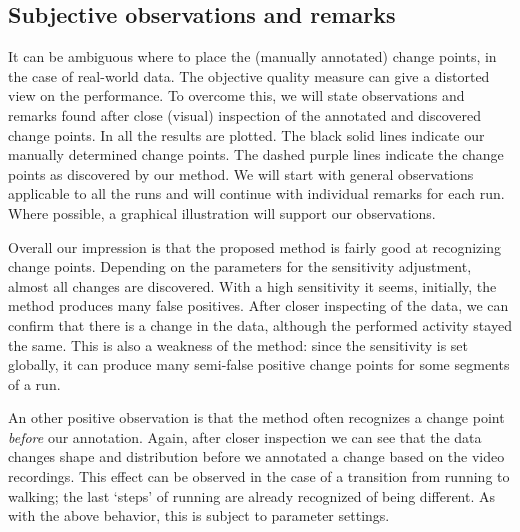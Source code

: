 \subsection{Subjective observations and remarks}
It can be ambiguous where to place the (manually annotated) change points, in the case of real-world data.
The objective quality measure can give a distorted view on the performance.
To overcome this, we will state observations and remarks found after close (visual) inspection of the annotated and discovered change points.
In  all the results are plotted.
The black solid lines indicate our manually determined change points.
The dashed purple lines indicate the change points as discovered by our method.
We will start with general observations applicable to all the runs and will continue with individual remarks for each run.
Where possible, a graphical illustration will support our observations.

Overall our impression is that the proposed method is fairly good at recognizing change points.
Depending on the parameters for the sensitivity adjustment, almost all changes are discovered.
With a high sensitivity it seems, initially, the method produces many false positives.
After closer inspecting of the data, we can confirm that there is a change in the data, although the performed activity stayed the same.
This is also a weakness of the method: since the sensitivity is set globally, it can produce many semi-false positive change points for some segments of a run.

An other positive observation is that the method often recognizes a change point \emph{before} our annotation.
Again, after closer inspection we can see that the data changes shape and distribution before we annotated a change based on the video recordings.
This effect can be observed in the case of a transition from running to walking; the last `steps' of running are already recognized of being different.
As with the above behavior, this is subject to parameter settings.

